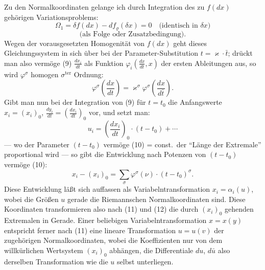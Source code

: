 \documentclass[12pt,a4paper]{article}
\begin{document}
Zu den Normalkoordinaten gelange ich durch Integration des zu $f(dx)$ geh\"origen Variationsproblems:
\begin{equation}\tag{9}
\varOmega_{1}=\delta f(dx)-df_{\varrho}(\delta x)=0\quad\text{(identisch in $\delta x$)}
\end{equation}
\[
\text{(als Folge oder Zusatzbedingung).}
\]
Wegen der vorausgesetzten Homogenit\"at von $f(dx)$ geht dieses Gleichungssystem in sich \"uber bei der Parameter-Substitution $t=\varkappa\cdot\bar{t}$; dr\"uckt man also verm\"oge (9) $\frac{dx_{i}}{dt}$ als Funktion $\varphi_{i}\left(\frac{dx}{dt},x\right)$ der ersten Ableitungen aus, so wird $\varphi^{\sigma}$ homogen $\sigma^{\mathrm{ter}}$ Ordnung:
\begin{equation}\tag{10}
\varphi^{\sigma}\left(\frac{dx}{dt}\right)=\varkappa^{\sigma}\varphi^{\sigma}\left(\frac{dx}{d\bar{t}}\right).
\end{equation}
Gibt man nun bei der Integration von (9) f\"ur $t=t_{0}$ die Anfangswerte $x_{i}=(x_{i})_{0}$, $\frac{dy_{i}}{dt}=\left(\frac{dx_{i}}{dt}\right)_{0}$ vor, und setzt man:
\begin{equation}\tag{11}
u_{i}=\left(\frac{dx_{i}}{dt}\right)_{0}\cdot(t-t_{0})+\cdots
\end{equation}
--- wo der Parameter $(t-t_{0})$ verm\"oge (10) = const.\ der ``L\"ange der Extremale'' proportional wird --- so gibt die Entwicklung nach Potenzen von $(t-t_{0})$ verm\"oge (10):
\begin{equation}\tag{12}
x_{i}-(x_{i})_{0}=\sum_{\sigma}\varphi^{\sigma}(\nu)\cdot(t-t_{0})^{\sigma}.
\end{equation}
Diese Entwicklung l\"a\ss{}t sich auffassen als Variabelntransformation $x_{i}=\alpha_{i}(u)$, wobei die Gr\"o\ss{}en $u$ gerade die Riemannschen Normalkoordinaten sind. Diese Koordinaten transformieren also nach (11) und (12) die durch $(x_{i})_{0}$ gehenden Extremalen in Gerade. Einer beliebigen Variabelntransformation $x=x(y)$ entspricht ferner nach (11) eine lineare Transformation $u=u(v)$ der zugeh\"origen Normalkoordinaten, wobei die Koeffizienten nur von dem willk\"urlichen Wertsystem $(x_{i})_{0}$ abh\"angen, die Differentiale $du$, $d\bar{u}$ also derselben Transformation wie die $u$ selbst unterliegen.
\end{document}
